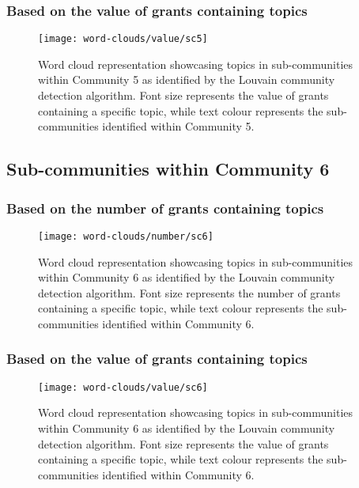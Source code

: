 \clearpage

\subsubsection{Based on the value of grants containing topics}

\begin{figure}[htbp]
    \centering
    \texttt{[image: word-clouds/value/sc5]}
    \caption[Word cloud representation based on the value of grants containing topics in sub-communities within Community 5]{Word cloud representation showcasing topics in sub-communities within Community 5 as identified by the Louvain community detection algorithm. Font size represents the value of grants containing a specific topic, while text colour represents the sub-communities identified within Community 5.}
    \label{fig:topic_grant_value_sc5}
\end{figure}

\subsection{Sub-communities within Community 6}

\subsubsection{Based on the number of grants containing topics}

\begin{figure}[htbp]
    \centering
    \texttt{[image: word-clouds/number/sc6]}
    \caption[Word cloud representation based on the number of grants containing topics in sub-communities within Community 6]{Word cloud representation showcasing topics in sub-communities within Community 6 as identified by the Louvain community detection algorithm. Font size represents the number of grants containing a specific topic, while text colour represents the sub-communities identified within Community 6.}
    \label{fig:topic_grant_number_sc6}
\end{figure}

\clearpage

\subsubsection{Based on the value of grants containing topics}

\begin{figure}[htbp]
    \centering
    \texttt{[image: word-clouds/value/sc6]}
    \caption[Word cloud representation based on the value of grants containing topics in sub-communities within Community 6]{Word cloud representation showcasing topics in sub-communities within Community 6 as identified by the Louvain community detection algorithm. Font size represents the value of grants containing a specific topic, while text colour represents the sub-communities identified within Community 6.}
    \label{fig:topic_grant_value_sc6}
\end{figure}